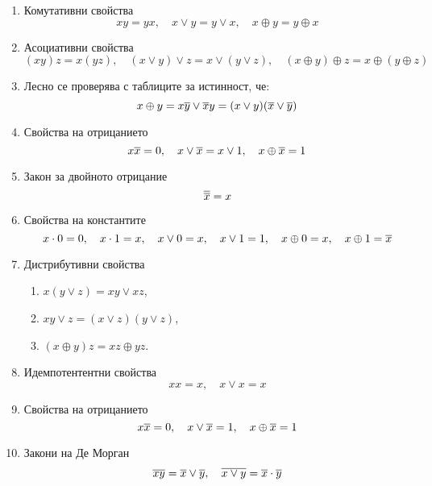 \begin{enumerate}[1)]%
\item
  Комутативни свойства
  \[xy = yx,\quad x\vee y = y\vee x,\quad x\oplus y = y\oplus x\]
\item
  Асоциативни свойства
  \[(xy)z = x(yz),\quad (x\vee y)\vee z = x\vee (y\vee z),\quad (x\oplus y)\oplus z = x\oplus (y\oplus z)\]
\item
  Лесно се проверява с таблиците за истинност, че:
  \[x\oplus y = x\overline{y}\vee \overline{x}y = (x\vee y)(\overline{x}\vee\overline{y})\]
\item
  Свойства на отрицанието
  \[x\overline{x} = 0, \quad x\vee\overline{x} = x\vee 1,\quad x\oplus\overline{x} = 1\]
\item
  Закон за двойното отрицание
  \[\overline{\overline{x}} = x\]
\item
  Свойства на константите
  \[x\cdot 0 = 0, \quad x\cdot 1 = x,\quad x\vee 0 = x,\quad x\vee 1 = 1,\quad x\oplus 0 = x, \quad x\oplus 1 = \overline{x}\]
\item
  Дистрибутивни свойства
  \begin{enumerate}[]
  \item
    $x(y\vee z) = xy \vee xz$,
  \item
    $xy \vee z = (x\vee z)(y\vee z)$,
  \item
    $(x\oplus y)z = xz \oplus yz$.
  \end{enumerate}
\item
  Идемпотентентни свойства
  \[xx = x, \quad x\vee x = x\]
\item
  Свойства на отрицанието
  \[x\overline{x} = 0, \quad x\vee\overline{x} = 1, \quad x\oplus\overline{x} = 1\]
\item
  Закони на Де Морган
  \[\overline{xy} = \overline{x}\vee\overline{y}, \quad \overline{x\vee y} = \overline{x}\cdot\overline{y}\]
\end{enumerate}

